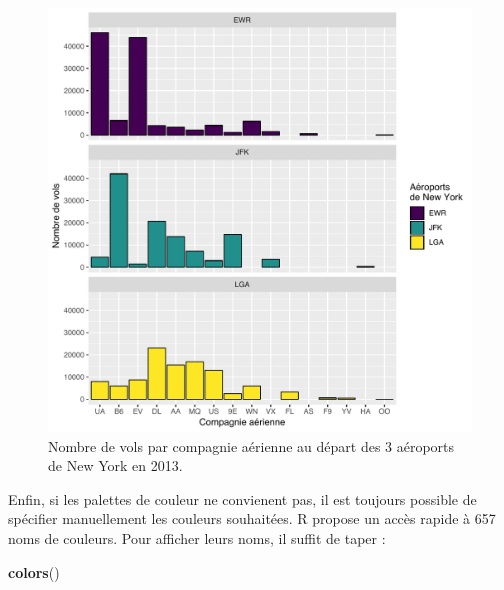 \documentclass[a4paperpaper,]{article}
\newenvironment{Shaded}{\begin{snugshade}}{\end{snugshade}}
\newcommand{\KeywordTok}[1]{\textcolor[rgb]{0.13,0.29,0.53}{\textbf{#1}}}
\newcommand{\NormalTok}[1]{#1}
\theoremstyle{definition}
\theoremstyle{definition}
\theoremstyle{definition}
\theoremstyle{remark}
\begin{document}
\begin{figure}[htpb]

{\centering \includegraphics[width=0.9\linewidth]{figure/barfacetviridis-1} 

}

\caption{Nombre de vols par compagnie aérienne au départ des 3 aéroports de New York en 2013.}\label{fig:barfacetviridis}
\end{figure}

Enfin, si les palettes de couleur ne convienent pas, il est toujours
possible de spécifier manuellement les couleurs souhaitées. R propose un
accès rapide à 657 noms de couleurs. Pour afficher leurs noms, il suffit
de taper :

\begin{Shaded}
\begin{Highlighting}[]
\KeywordTok{colors}\NormalTok{()}
\end{Highlighting}
\end{Shaded}
\end{document}
